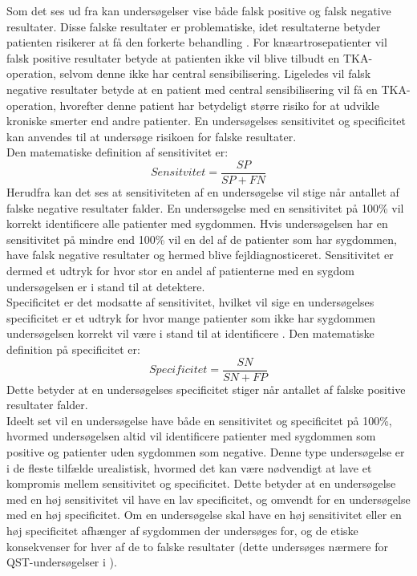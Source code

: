 Som det ses ud fra  kan undersøgelser vise både falsk positive og falsk negative resultater. Disse falske resultater er problematiske, idet resultaterne betyder patienten risikerer at få den forkerte behandling \citep{Lalkhen2008}. For knæartrosepatienter vil falsk positive resultater betyde at patienten ikke vil blive tilbudt en TKA-operation, selvom denne ikke har central sensibilisering. Ligeledes vil falsk negative resultater betyde at en patient med central sensibilisering vil få en TKA-operation, hvorefter denne patient har betydeligt større risiko for at udvikle kroniske smerter end andre patienter. En undersøgelses sensitivitet og specificitet kan anvendes til at undersøge risikoen for falske resultater. \\
Den matematiske definition af sensitivitet er: \\
\begin{equation}
Sensitvitet=\frac{SP}{SP+FN}
\end{equation}
Herudfra kan det ses at sensitiviteten af en undersøgelse vil stige når antallet af falske negative resultater falder. En undersøgelse med en sensitivitet på 100\% vil korrekt identificere alle patienter med sygdommen. Hvis undersøgelsen har en sensitivitet på mindre end 100\% vil en del af de patienter som har sygdommen, have falsk negative resultater og hermed blive fejldiagnosticeret. Sensitivitet er dermed et udtryk for hvor stor en andel af patienterne med en sygdom undersøgelsen er i stand til at detektere. \citep{Lalkhen2008} \\
Specificitet er det modsatte af sensitivitet, hvilket vil sige en undersøgelses specificitet er et udtryk for hvor mange patienter som ikke har sygdommen undersøgelsen korrekt vil være i stand til at identificere \citep{Lalkhen2008}. Den matematiske definition på specificitet er: \\
\begin{equation}
Specificitet=\frac{SN}{SN+FP}
\end{equation}
Dette betyder at en undersøgelses specificitet stiger når antallet af falske positive resultater falder. \citep{Lalkhen2008} \\
Ideelt set vil en undersøgelse have både en sensitivitet og specificitet på 100\%, hvormed undersøgelsen altid vil identificere patienter med sygdommen som positive og patienter uden sygdommen som negative. Denne type undersøgelse er i de fleste tilfælde urealistisk, hvormed det kan være nødvendigt at lave et kompromis mellem sensitivitet og specificitet. Dette betyder at en undersøgelse med en høj sensitivitet vil have en lav specificitet, og omvendt for en undersøgelse med en høj specificitet. Om en undersøgelse skal have en høj sensitivitet eller en høj specificitet afhænger af sygdommen der undersøges for, og de etiske konsekvenser for hver af de to falske resultater (dette undersøges nærmere for QST-undersøgelser i ). \\

